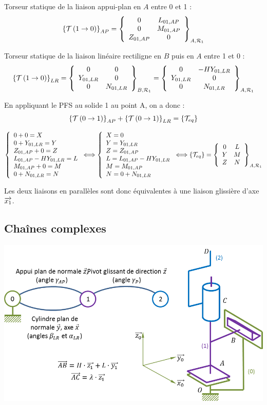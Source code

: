 \documentclass[10pt]{article}
\begin{document}
\noindent\colorbox{grisf}{}

Torseur statique de la liaison appui-plan en $A$ entre 0 et 1 :
$$
\torseurstat{T}{1}{0}_{AP}=
\torseurcol{0}{0}{Z_{01,AP}}{L_{01,AP}}{M_{01,AP}}{0}{A,\mathcal{R}_1}
$$

Torseur statique de la liaison linéaire rectiligne en $B$ puis en $A$ entre 1 et 0 :
$$
\torseurstat{T}{1}{0}_{LR}=
\torseurcol{0}{Y_{01,LR}}{0}{0}{0}{N_{01,LR}}{B,\mathcal{R}_1}
=
\torseurcol{0}{Y_{01,LR}}{0}{-HY_{01,LR}}{0}{N_{01,LR}}{A,\mathcal{R}_1}
$$


En appliquant le PFS au solide 1 au point A, on a donc :
$$
\torseurstat{T}{0}{1}_{AP}+\torseurstat{T}{0}{1}_{LR}=\{\mathcal{T}_{eq}\}
$$

$$
\left\{
\begin{array}{l}
0+0 = X \\
0+Y_{01,LR}=Y\\
Z_{01,AP}+0=Z\\
L_{01,AP}-HY_{01,LR}=L\\
M_{01,AP}+0=M\\
0+N_{01,LR}=N
\end{array}
\right.
\Longleftrightarrow
\left\{
\begin{array}{l}
X = 0 \\
Y=Y_{01,LR}\\
Z=Z_{01,AP}\\
L=L_{01,AP}-HY_{01,LR}\\
M=M_{01,AP}\\
N=0+N_{01,LR}
\end{array}
\right.
\Longleftrightarrow
\{\mathcal{T}_{eq}\} =
\torseurcol{0}{Y}{Z}{L}{M}{N}{A,\mathcal{R}_1}
$$

Les deux liaisons en parallèles sont donc équivalentes à une liaison glissière d'axe $\vect{x_1}$.
\subsection{Chaînes complexes}
\begin{exemple}
\begin{center}
\includegraphics[width=.8\textwidth]{images/cc}
\end{center}
\end{exemple}
\end{document}

